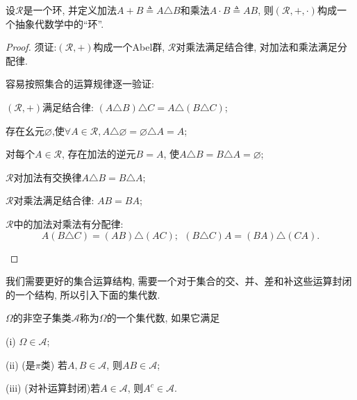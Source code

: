 \begin{theorem}
	设$\mathscr{R}$是一个环, 并定义加法$A+B\triangleq A\triangle B$和乘法$A\cdot B \triangleq AB$,
	则$(\mathscr{R},+,\cdot)$构成一个抽象代数学中的“环”.
\end{theorem}
\begin{proof}
	须证:$(\mathscr{R},+)$构成一个Abel群, $\mathscr{R}$对乘法满足结合律, 对加法和乘法满足分配律.
	
	容易按照集合的运算规律逐一验证:
	\begin{blist}
		\item $(\mathscr{R},+)$满足结合律: $(A\triangle B)\triangle C = A\triangle (B\triangle C)$;
		\item 存在幺元$\varnothing$,使$\forall A\in\mathscr{R}, A\triangle\varnothing = \varnothing\triangle A = A$;
		\item 对每个$A\in\mathscr{R}$, 存在加法的逆元$B = A$, 使$A\triangle B = B\triangle A = \varnothing$;
		\item $\mathscr{R}$对加法有交换律$A\triangle B = B\triangle A$;
		\item $\mathscr{R}$对乘法满足结合律: $AB = BA$;
		\item $\mathscr{R}$中的加法对乘法有分配律:\begin{equation}
		A(B\triangle C) = (AB)\triangle (AC);~~(B\triangle C)A = (BA)\triangle (CA).
		\end{equation}
	\end{blist}
\end{proof}

我们需要更好的集合运算结构, 需要一个对于集合的交、并、差和补这些运算封闭的一个结构, 所以引入下面的集代数.

\begin{definition}[(集)代数]\label{集代数}
	 $\Omega$的非空子集类$\mathscr{A}$称为$\Omega$的一个集代数, 如果它满足
	\begin{blist}
		\item[(i)] $\Omega\in\mathscr{A}$;
		\item[(ii)] (是$\pi$类) 若$A,B\in\mathscr{A}$, 则$AB\in\mathscr{A}$;
		\item[(iii)] (对补运算封闭)若$A\in\mathscr{A}$, 则$A^c\in\mathscr{A}$.
	\end{blist}
\end{definition}


